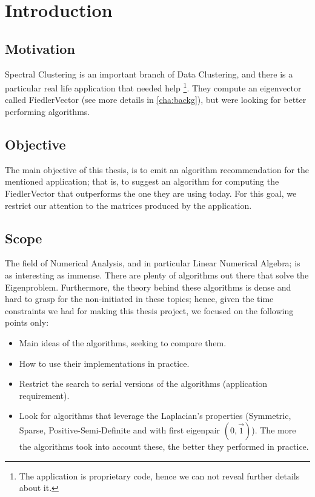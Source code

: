 \chapter{Introduction}

\section{Motivation}

Spectral Clustering \cite{luxburg07} is an important branch of Data Clustering,
and there is a particular real life application that needed
help \footnote{The application is proprietary code, hence we can not
  reveal further details about it.}. They  
compute an eigenvector called \gls{FiedlerVector} (see more
details in \cref{cha:backg}), but were looking for better performing
algorithms.

\section{Objective}

The main objective of this thesis, is to emit an algorithm
recommendation for the mentioned application; that is, to suggest
an algorithm for computing the \gls{FiedlerVector} that outperforms
the one they are using today. For this goal, we restrict our attention
to the matrices produced by the application.

\section{Scope}

The field of Numerical Analysis, and in particular Linear Numerical
Algebra; is as interesting as immense. There are plenty of algorithms
out there that solve the Eigenproblem. Furthermore, the theory behind
these algorithms is dense and hard to 
grasp for the non-initiated in these topics; hence, given
the time constraints we had for making this thesis project, we focused
on the following points only:

\begin{itemize}
\item Main ideas of the algorithms, seeking to compare them.
\item How to use their implementations in practice.
\item Restrict the search to serial versions of the algorithms
  (application requirement).
\item Look for algorithms that leverage the \gls{Laplacian}'s properties
  (Symmetric, Sparse, Positive-Semi-Definite and with first eigenpair
  $(0,\vec{1})$). The more the algorithms took into account these, the
  better they performed in practice. 
\end{itemize}

